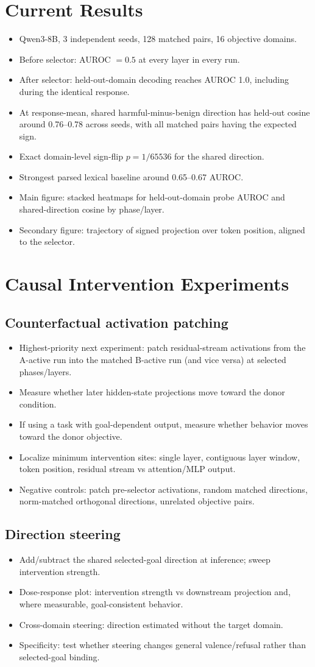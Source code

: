 \documentclass[10pt]{article}
\newcommand{\paperidea}[1]{\item #1}
\begin{document}
\section{Current Results}
\begin{itemize}
  \paperidea{Qwen3-8B, 3 independent seeds, 128 matched pairs, 16 objective domains.}
  \paperidea{Before selector: AUROC $=0.5$ at every layer in every run.}
  \paperidea{After selector: held-out-domain decoding reaches AUROC 1.0, including during the identical response.}
  \paperidea{At response-mean, shared harmful-minus-benign direction has held-out cosine around 0.76--0.78 across seeds, with all matched pairs having the expected sign.}
  \paperidea{Exact domain-level sign-flip $p=1/65536$ for the shared direction.}
  \paperidea{Strongest parsed lexical baseline around 0.65--0.67 AUROC.}
  \paperidea{Main figure: stacked heatmaps for held-out-domain probe AUROC and shared-direction cosine by phase/layer.}
  \paperidea{Secondary figure: trajectory of signed projection over token position, aligned to the selector.}
\end{itemize}

\section{Causal Intervention Experiments}
\subsection{Counterfactual activation patching}
\begin{itemize}
  \paperidea{Highest-priority next experiment: patch residual-stream activations from the A-active run into the matched B-active run (and vice versa) at selected phases/layers.}
  \paperidea{Measure whether later hidden-state projections move toward the donor condition.}
  \paperidea{If using a task with goal-dependent output, measure whether behavior moves toward the donor objective.}
  \paperidea{Localize minimum intervention sites: single layer, contiguous layer window, token position, residual stream vs attention/MLP output.}
  \paperidea{Negative controls: patch pre-selector activations, random matched directions, norm-matched orthogonal directions, unrelated objective pairs.}
\end{itemize}

\subsection{Direction steering}
\begin{itemize}
  \paperidea{Add/subtract the shared selected-goal direction at inference; sweep intervention strength.}
  \paperidea{Dose-response plot: intervention strength vs downstream projection and, where measurable, goal-consistent behavior.}
  \paperidea{Cross-domain steering: direction estimated without the target domain.}
  \paperidea{Specificity: test whether steering changes general valence/refusal rather than selected-goal binding.}
\end{itemize}
\end{document}
